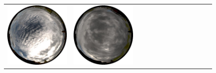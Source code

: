 \begin{figure}
\begin{tabular}{@{}rcccccccccccc@{}}
    \includegraphics[width=\customwidth]{./figures/database/20131106_145915.jpg} &
    \includegraphics[width=\customwidth]{./figures/database/20131106_152913.jpg} &

\end{tabular}
\end{figure}
